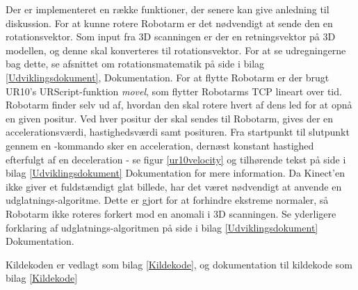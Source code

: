 Der er implementeret en række funktioner, der senere kan give anledning til diskussion. 
For at kunne rotere Robotarm er det nødvendigt at sende den en rotationsvektor. Som input fra 3D scanningen er der en retningsvektor på 3D modellen, og denne skal konverteres til rotationsvektor. For at se udregningerne bag dette, se afsnittet om rotationsmatematik på side \pageref{rotationsmatematik} i bilag \ref{Udviklingsdokument}, Dokumentation.
\newline
For at flytte Robotarm er der brugt UR10's URScript-funktion \textit{movel}, som flytter Robotarms TCP lineart over tid. Robotarm finder selv ud af, hvordan den skal rotere hvert af dens led for at opnå en given positur. Ved hver positur der skal sendes til Robotarm, gives der en accelerationsværdi, hastighedsværdi samt posituren. Fra startpunkt til slutpunkt gennem en -kommando sker en acceleration, dernæst konstant hastighed efterfulgt af en deceleration - se figur \ref{ur10velocity} og tilhørende tekst på side \pageref{ur10velocity} i bilag \ref{Udviklingsdokument} Dokumentation for mere information.
\newline
Da Kinect'en ikke giver et fuldstændigt glat billede, har det været nødvendigt at anvende en udglatnings-algoritme. Dette er gjort for at forhindre ekstreme normaler, så Robotarm ikke roteres forkert mod en anomali i 3D scanningen. Se yderligere forklaring af udglatnings-algoritmen på side \pageref{calculationlibraryafsnit} i bilag \ref{Udviklingsdokument} Dokumentation.

Kildekoden er vedlagt som bilag \ref{Kildekode}, og dokumentation til kildekode som bilag \ref{Kildekode}
